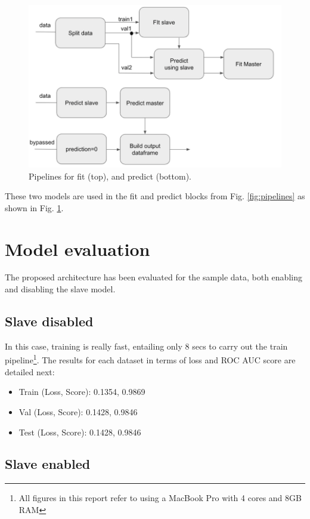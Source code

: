 \documentclass[11pt, oneside]{article}   	%
\begin{document}
\begin{figure}[]
\centerline{\includegraphics[width=0.8\linewidth]{fit_predict.png}} 
\caption{Pipelines for fit (top), and predict (bottom).}
\label{fig:fit_predict}
\end{figure}

These two models are used in the fit and predict blocks from Fig. \ref{fig:pipelines} as shown in Fig. \ref{fig:fit_predict}. 

\section{Model evaluation}

The proposed architecture has been evaluated for the sample data, both enabling and disabling the slave model.

\subsection{Slave disabled}

In this case, training is really fast, entailing only 8 secs to carry out the train pipeline\footnote{All figures in this report refer to using a MacBook Pro with 4 cores and 8GB RAM}. The results for each dataset in terms of loss and ROC AUC score are detailed next:
\begin{itemize}
\item Train (Loss, Score): 0.1354, 0.9869
\item Val (Loss, Score): 0.1428, 0.9846
\item Test (Loss, Score): 0.1428, 0.9846
\end{itemize}

\subsection{Slave enabled}
\end{document}
